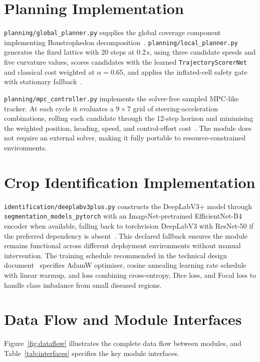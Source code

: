 \documentclass[12pt, a4paper]{article}
\begin{document}
\section{Planning Implementation}

\texttt{planning/global\_planner.py} supplies the global coverage component implementing
Boustrophedon decomposition~\cite{ref234}. \texttt{planning/local\_planner.py} generates
the fixed lattice with 20 steps at 0.2\,s, using three candidate speeds and five curvature
values, scores candidates with the learned \texttt{TrajectoryScorerNet} and classical
cost weighted at $\alpha\!=\!0.65$, and applies the inflated-cell safety gate with
stationary fallback~\cite{ref234}.

\texttt{planning/mpc\_controller.py} implements the solver-free sampled MPC-like tracker.
At each cycle it evaluates a $9\!\times\!7$ grid of steering-acceleration combinations,
rolling each candidate through the 12-step horizon and minimising the weighted position,
heading, speed, and control-effort cost~\cite{ref234}. The module does not require an
external solver, making it fully portable to resource-constrained environments.

\section{Crop Identification Implementation}

\texttt{identification/deeplabv3plus.py} constructs the DeepLabV3+ model through
\texttt{segmentation\_models\_pytorch} with an ImageNet-pretrained EfficientNet-B4 encoder
when available, falling back to torchvision DeepLabV3 with ResNet-50 if the preferred
dependency is absent~\cite{ref234}. This declared fallback ensures the module remains
functional across different deployment environments without manual intervention. The
training schedule recommended in the technical design document~\cite{ref233} specifies
AdamW optimiser, cosine annealing learning rate schedule with linear warmup, and loss
combining cross-entropy, Dice loss, and Focal loss to handle class imbalance from small
diseased regions.

\section{Data Flow and Module Interfaces}

Figure~\ref{fig:dataflow} illustrates the complete data flow between modules, and
Table~\ref{tab:interfaces} specifies the key module interfaces.
\end{document}
